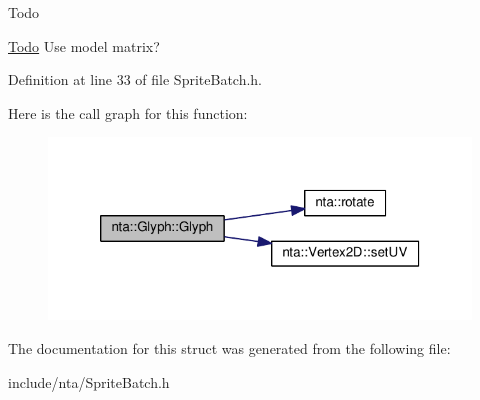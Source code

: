 \begin{DoxyRefDesc}{Todo}
\item[\hyperlink{todo__todo000004}{Todo}]Use model matrix? \end{DoxyRefDesc}


Definition at line 33 of file Sprite\+Batch.\+h.

Here is the call graph for this function\+:
\nopagebreak
\begin{figure}[H]
\begin{center}
\leavevmode
\includegraphics[width=320pt]{d6/db3/structnta_1_1Glyph_a3b2afa4370140736d9d1b28de20d2105_cgraph}
\end{center}
\end{figure}


The documentation for this struct was generated from the following file\+:\begin{DoxyCompactItemize}
\item 
include/nta/Sprite\+Batch.\+h\end{DoxyCompactItemize}

